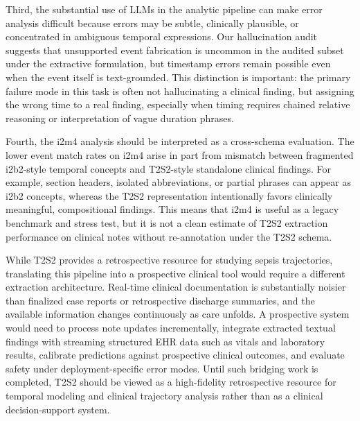 Third, the substantial use of LLMs in the analytic pipeline can make error analysis difficult because errors may be subtle, clinically plausible, or concentrated in ambiguous temporal expressions.
Our hallucination audit suggests that unsupported event fabrication is uncommon in the audited subset under the extractive formulation, but timestamp errors remain possible even when the event itself is text-grounded.
This distinction is important: the primary failure mode in this task is often not hallucinating a clinical finding, but assigning the wrong time to a real finding, especially when timing requires chained relative reasoning or interpretation of vague duration phrases.

Fourth, the i2m4 analysis should be interpreted as a cross-schema evaluation.
The lower event match rates on i2m4 arise in part from mismatch between fragmented i2b2-style temporal concepts and T2S2-style standalone clinical findings.
For example, section headers, isolated abbreviations, or partial phrases can appear as i2b2 concepts, whereas the T2S2 representation intentionally favors clinically meaningful, compositional findings.
This means that i2m4 is useful as a legacy benchmark and stress test, but it is not a clean estimate of T2S2 extraction performance on clinical notes without re-annotation under the T2S2 schema.

While T2S2 provides a retrospective resource for studying sepsis trajectories, translating this pipeline into a prospective clinical tool would require a different extraction architecture.
Real-time clinical documentation is substantially noisier than finalized case reports or retrospective discharge summaries, and the available information changes continuously as care unfolds.
A prospective system would need to process note updates incrementally, integrate extracted textual findings with streaming structured EHR data such as vitals and laboratory results, calibrate predictions against prospective clinical outcomes, and evaluate safety under deployment-specific error modes.
Until such bridging work is completed, T2S2 should be viewed as a high-fidelity retrospective resource for temporal modeling and clinical trajectory analysis rather than as a clinical decision-support system.

